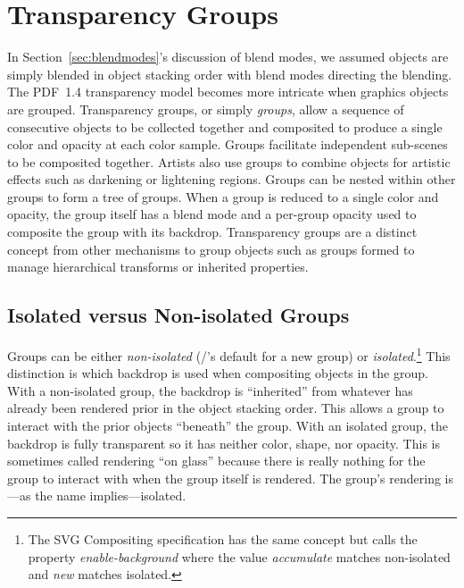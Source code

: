 
\section{Transparency Groups}
\label{sec:transparency-groups}

In Section~\ref{sec:blendmodes}'s discussion of blend modes, we assumed objects are simply blended in object stacking
order with blend modes directing the blending.
The PDF~1.4 transparency model becomes more intricate when graphics objects are grouped.
Transparency groups, or simply {\em groups}, allow a sequence of consecutive objects to be
collected together and composited
to produce a single color and opacity at each color sample.  Groups facilitate independent sub-scenes
to be composited together.  Artists also use groups to combine objects for artistic effects such
as darkening or lightening regions.  Groups can be nested within other groups to form a tree of groups.
When a group is reduced to a single color and opacity, the group itself has a blend mode and a per-group opacity 
used to composite the group with its backdrop.
Transparency groups are a distinct concept from other mechanisms to
group objects such as groups formed to manage hierarchical
transforms or inherited properties.

\subsection{Isolated versus Non-isolated Groups}
\label{sec:transparency-groups}

Groups can be either {\em non-isolated} (\Illustrator/'s default for a new group) or
{\em isolated}.\footnote{The SVG Compositing specification \cite{SVG-Compositing-Spec}
has the same concept but calls the property {\em enable-background} where
the value {\em accumulate} matches non-isolated and {\em new} matches isolated.}
This distinction is
which backdrop is used when compositing objects in the group.  With a non-isolated group, the backdrop is ``inherited''
from whatever has already been rendered prior in the object stacking order.  This allows
a group to interact with the prior objects ``beneath'' the group.  With an isolated group, the backdrop is
fully transparent so it has neither color, shape, nor opacity.
This is sometimes called rendering ``on glass'' because there is really
nothing for the group to interact with when the group itself is rendered.  The group's rendering is---as the name implies---isolated.


